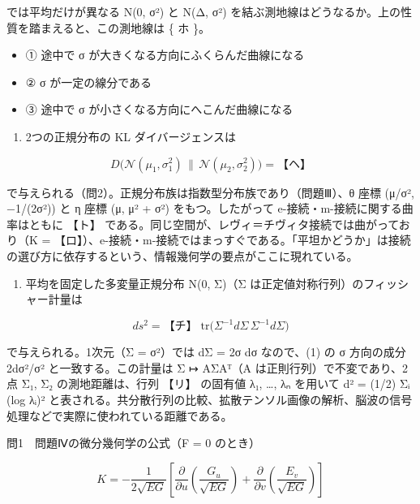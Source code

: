 \documentclass[
  10pt,
  a4paper,
]{article}
\providecommand{\tightlist}{%
  \setlength{\itemsep}{0pt}\setlength{\parskip}{0pt}}
\begin{document}
では平均だけが異なる N(0, σ²) と N(Δ, σ²)
を結ぶ測地線はどうなるか。上の性質を踏まえると、この測地線は \{ ホ \}。

\begin{itemize}
\tightlist
\item
  ① 途中で σ が大きくなる方向にふくらんだ曲線になる
\item
  ② σ が一定の線分である
\item
  ③ 途中で σ が小さくなる方向にへこんだ曲線になる
\end{itemize}

\begin{enumerate}
\def\labelenumi{(\arabic{enumi})}
\setcounter{enumi}{2}
\tightlist
\item
  2つの正規分布の KL ダイバージェンスは
\end{enumerate}

\[D\big(\mathcal{N}(\mu_1, \sigma_1^2) \,\|\, \mathcal{N}(\mu_2, \sigma_2^2)\big) = \text{【ヘ】}\]

で与えられる（問2）。正規分布族は指数型分布族であり（問題Ⅲ）、θ 座標
(μ/σ², −1/(2σ²)) と η 座標 (μ, μ² + σ²) をもつ。したがって
e-接続・m-接続に関する曲率はともに 【ト】
である。同じ空間が、レヴィ＝チヴィタ接続では曲がっており（K =
【ロ】）、e-接続・m-接続ではまっすぐである。「平坦かどうか」は接続の選び方に依存するという、情報幾何学の要点がここに現れている。

\begin{enumerate}
\def\labelenumi{(\arabic{enumi})}
\setcounter{enumi}{3}
\tightlist
\item
  平均を固定した多変量正規分布 N(0, Σ)（Σ
  は正定値対称行列）のフィッシャー計量は
\end{enumerate}

\[ds^2 = \text{【チ】}\; \mathrm{tr}\big( \Sigma^{-1} d\Sigma\, \Sigma^{-1} d\Sigma \big)\]

で与えられる。1次元（Σ = σ²）では dΣ = 2σ dσ なので、(1) の σ 方向の成分
2dσ²/σ² と一致する。この計量は Σ {\fallbackfont ↦}
AΣA{\fallbackfont ᵀ}（A は正則行列）で不変であり、2点
Σ{\fallbackfont ₁}, Σ{\fallbackfont ₂} の測地距離は、行列 【リ】
の固有値 λ{\fallbackfont ₁}, \ldots, λ{\fallbackfont ₙ} を用いて d² =
(1/2) Σ{\fallbackfont ᵢ} (log λ{\fallbackfont ᵢ})²
と表される。共分散行列の比較、拡散テンソル画像の解析、脳波の信号処理などで実際に使われている距離である。

問1　問題Ⅳの微分幾何学の公式（F = 0 のとき）

\[K = -\frac{1}{2\sqrt{EG}} \left[ \frac{\partial}{\partial u}\left( \frac{G_u}{\sqrt{EG}} \right) + \frac{\partial}{\partial v}\left( \frac{E_v}{\sqrt{EG}} \right) \right]\]
\end{document}
